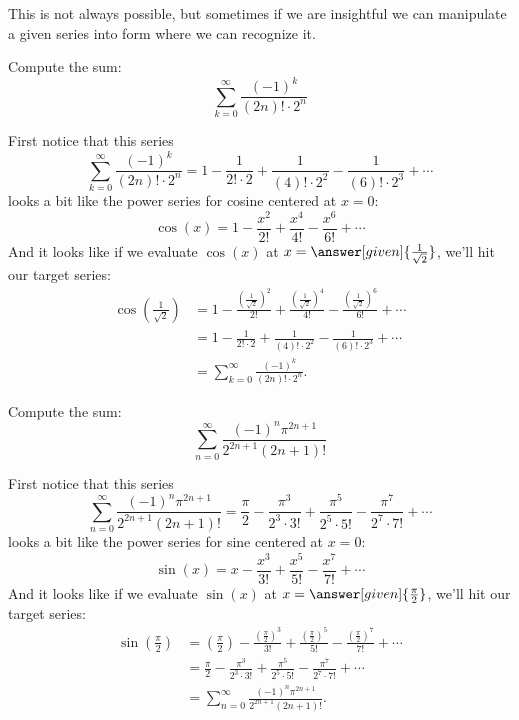 \documentclass{ximera}
\begin{document}
This is not always possible, but sometimes if we are insightful we can
manipulate a given series into form where we can recognize it.


\begin{example}
  Compute the sum:
  \[
  \sum_{k=0}^\infty \frac{(-1)^k}{(2n)!\cdot 2^n}
  \]
  \begin{explanation}
    First notice that this series
    \[
    \sum_{k=0}^\infty \frac{(-1)^k}{(2n)!\cdot 2^n} = 1 - \frac{1}{2!\cdot 2} + \frac{1}{(4)!\cdot 2^2}-\frac{1}{(6)!\cdot 2^3} + \cdots
    \]
    looks a bit like the power series for cosine centered at $x=0$:
    \[
    \cos(x) = 1-\frac{x^2}{2!} + \frac{x^4}{4!} - \frac{x^6}{6!}+ \cdots
    \]
    And it looks like if we evaluate $\cos(x)$ at $x =
    \answer[given]{\frac{1}{\sqrt{2}}}$, we'll hit our target series:
    \begin{align*}
      \cos\left(\frac{1}{\sqrt{2}}\right) &=1-\frac{\left(\frac{1}{\sqrt{2}}\right)^2}{2!} + \frac{\left(\frac{1}{\sqrt{2}}\right)^4}{4!} - \frac{\left(\frac{1}{\sqrt{2}}\right)^6}{6!}+ \cdots\\
      &= 1 - \frac{1}{2!\cdot 2} + \frac{1}{(4)!\cdot 2^2}-\frac{1}{(6)!\cdot 2^3} + \cdots\\
      &=\sum_{k=0}^\infty \frac{(-1)^k}{(2n)!\cdot 2^n}.
    \end{align*}
  \end{explanation}
\end{example}


\begin{example}
  Compute the sum:
  \[
  \sum_{n=0}^\infty \frac{(-1)^n \pi^{2n+1}}{2^{2n+1}(2n+1)!}
  \]
  \begin{explanation}
    First notice that this series
    \[
    \sum_{n=0}^\infty \frac{(-1)^n \pi^{2n+1}}{2^{2n+1}(2n+1)!} = \frac{\pi}{2} - \frac{\pi^3}{2^3\cdot 3!}+ \frac{\pi^5}{2^5\cdot 5!} - \frac{\pi^7}{2^7\cdot 7!} + \cdots
    \]
    looks a bit like the power series for sine centered at $x=0$:
    \[
    \sin(x) = x-\frac{x^3}{3!} + \frac{x^5}{5!} - \frac{x^7}{7!}+ \cdots
    \]
    And it looks like if we evaluate $\sin(x)$ at $x =
    \answer[given]{\frac{\pi}{2}}$, we'll hit our target series:
    \begin{align*}
      \sin\left(\frac{\pi}{2}\right) &=\left(\frac{\pi}{2}\right)-\frac{\left(\frac{\pi}{2}\right)^3}{3!} + \frac{\left(\frac{\pi}{2}\right)^5}{5!} - \frac{\left(\frac{\pi}{2}\right)^7}{7!}+ \cdots\\
      &= \frac{\pi}{2} - \frac{\pi^3}{2^3\cdot 3!}+ \frac{\pi^5}{2^5\cdot 5!} - \frac{\pi^7}{2^7\cdot 7!} + \cdots\\
      &=\sum_{n=0}^\infty \frac{(-1)^n \pi^{2n+1}}{2^{2n+1}(2n+1)!}.
    \end{align*}
  \end{explanation}
\end{example}
\end{document}

